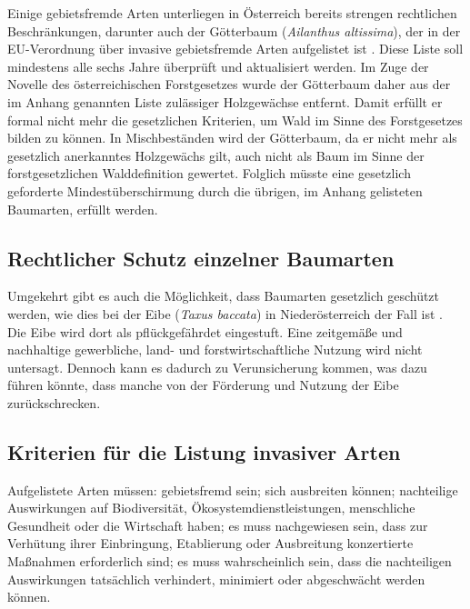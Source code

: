 \documentclass[twocolumn]{scrartcl}
\begin{document}
Einige gebietsfremde Arten unterliegen in Österreich bereits strengen
rechtlichen Beschränkungen, darunter auch der Götterbaum
(\emph{Ailanthus altissima}), der in der EU-Verordnung über invasive
gebietsfremde Arten aufgelistet ist
\citep{eu2019verordnungListeInvasiverArten,eu2014verordnungInvasiverArten}. Diese
Liste soll mindestens alle sechs Jahre überprüft und aktualisiert
werden. Im Zuge der Novelle des österreichischen Forstgesetzes wurde
der Götterbaum daher aus der im Anhang genannten Liste zulässiger
Holzgewächse entfernt. Damit erfüllt er formal nicht mehr die
gesetzlichen Kriterien, um Wald im Sinne des Forstgesetzes bilden zu
können. In Mischbeständen wird der Götterbaum, da er nicht mehr als
gesetzlich anerkanntes Holzgewächs gilt, auch nicht als Baum im Sinne
der forstgesetzlichen Walddefinition gewertet. Folglich müsste eine
gesetzlich geforderte Mindestüberschirmung durch die übrigen, im
Anhang gelisteten Baumarten, erfüllt werden.

\subsection{Rechtlicher Schutz einzelner Baumarten}

Umgekehrt gibt es auch die Möglichkeit, dass Baumarten gesetzlich
geschützt werden, wie dies bei der Eibe (\emph{Taxus baccata}) in
Niederösterreich der Fall ist
\citep{niederoesterreich2000Naturschutzgesetz,niederoesterreich2005artenschutzverordnung}. Die
Eibe wird dort als pflückgefährdet eingestuft. Eine zeitgemäße und
nachhaltige gewerbliche, land- und forstwirtschaftliche Nutzung wird
nicht untersagt. Dennoch kann es dadurch zu Verunsicherung kommen, was
dazu führen könnte, dass manche von der Förderung und Nutzung der Eibe
zurückschrecken.

\subsection{Kriterien für die Listung invasiver Arten}

Aufgelistete Arten müssen: gebietsfremd sein; sich ausbreiten können;
nachteilige Auswirkungen auf Biodiversität, Ökosystemdienstleistungen,
menschliche Gesundheit oder die Wirtschaft haben; es muss nachgewiesen
sein, dass zur Verhütung ihrer Einbringung, Etablierung oder
Ausbreitung konzertierte Maßnahmen erforderlich sind; es muss
wahrscheinlich sein, dass die nachteiligen Auswirkungen tatsächlich
verhindert, minimiert oder abgeschwächt werden können.
\end{document}

